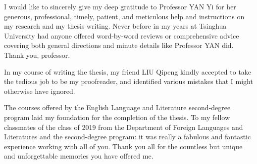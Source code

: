 \begin{acknowledgement}
  I would like to sincerely give my deep gratitude to Professor YAN Yi for her generous, professional, timely, patient, and meticulous help and instructions on my research and my thesis writing. Never before in my years at Tsinghua University had anyone offered word-by-word reviews or comprehensive advice covering both general directions and minute details like Professor YAN did. Thank you, professor.

  In my course of writing the thesis, my friend LIU Qipeng kindly accepted to take the tedious job to be my proofreader, and identified various mistakes that I might otherwise have ignored.

  The courses offered by the English Language and Literature second-degree program laid my foundation for the completion of the thesis. To my fellow classmates of the class of 2019 from the Department of Foreign Languages and Literatures and the second-degree program: it was really a fabulous and fantastic experience working with all of you. Thank you all for the countless but unique and unforgettable memories you have offered me.
\end{acknowledgement}
